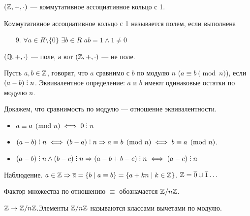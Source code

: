\slashn
\begin{example}
    $(\mathbb{Z}, +, \cdot)$ --- коммутативное ассоциативное кольцо с 1.
\end{example}
\begin{definition}
    Коммутативное ассоциативное кольцо с 1 называется полем, если выполнена 
    \begin{enumerate}
        \item[9.] $\forall a \in R \setminus \{0\}$  $\exists b \in R$  $ab = 1 \land 1 \neq 0$
    \end{enumerate}
\end{definition}
\begin{example}
    $(\mathbb{Q}, +, \cdot)$ --- поле, а вот  $(\mathbb{Z}, +, \cdot)$ --- не поле.
\end{example}

\begin{definition}
	Пусть $a, b \in \mathbb{Z}$, говорят, что  $a$ сравнимо с  $b$ по модулю  $n$ ($a \equiv b \pmod{n}$), если $(a - b) \divby n$. Эквивалентное определение:  $a$ и  $b$ имеют одинаковые остатки по модулю  $n$.
\end{definition}
Докажем, что сравнимость по модулю --- отношение эквивалентности.
\begin{itemize}
    \item $a \equiv a \pmod{n} \iff 0 \divby n$
    \item $(a - b) \divby n \iff (b - a) \divby n \Rightarrow a \equiv b \pmod{n} \iff b \equiv a \pmod{n}$.
    \item $(a - b) \divby n \land (b - c) \divby n \Rightarrow (a - b + b - c) \divby n \iff (a - c) \divby n$
\end{itemize}
\slashn
Наблюдение.  $a \in \mathbb{Z} \Rightarrow \overline{a} = \{b \mid a \equiv b\} = \{a + kn \mid k \in \mathbb{Z}\}$. $\mathbb{Z} = \overline{0} \cup \overline{1} \ldots$

\begin{definition}
    Фактор множества по отношению $\equiv$ обозначается  $\mathbb{Z} / n\mathbb{Z}$.
\end{definition}

$\mathbb{Z} \to \mathbb{Z} / n\mathbb{Z}$.Элементы $\mathbb{Z} / n\mathbb{Z}$ называются классами вычетами по модулю.

